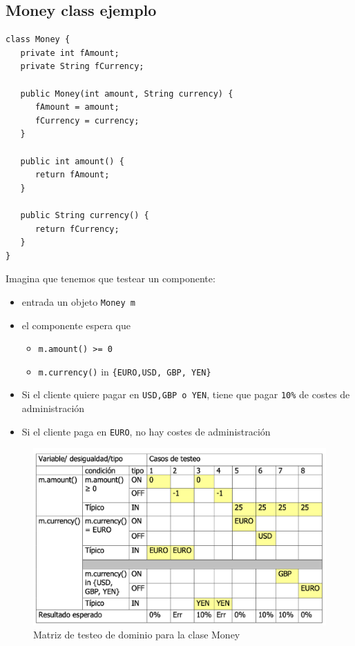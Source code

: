 \newpage
\subsection{Money class ejemplo}

\begin{paracol}{2}
   \begin{lstlisting}
class Money {
   private int fAmount;
   private String fCurrency;

   public Money(int amount, String currency) {
      fAmount = amount;
      fCurrency = currency;
   }

   public int amount() {
      return fAmount;
   }

   public String currency() {
      return fCurrency;
   }
}
   \end{lstlisting}

   \switchcolumn

   Imagina que tenemos que testear un componente:
\begin{itemize}
	\item entrada un objeto \lstinline|Money m|
	\item el componente espera que
	\begin{itemize}
      \item \lstinline|m.amount() >= 0|
      \item \lstinline|m.currency()| in \lstinline|{EURO,USD, GBP, YEN}|
   \end{itemize}
	\item Si el cliente quiere pagar en \lstinline|USD,GBP o YEN|, tiene que pagar \lstinline|10%| de costes de administración
	\item Si el cliente paga en \lstinline|EURO|, no hay costes de administración
\end{itemize}
\end{paracol}

\begin{figure}[htbp]
   \centering
   \includegraphics{images/05/matrizMoney.png}
   \caption{Matriz de testeo de dominio para la clase Money}
   \label{fig:05/matrizMoney}
\end{figure}


